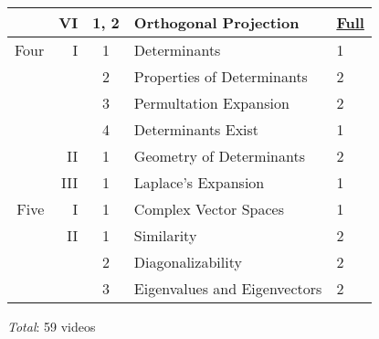 \documentclass{article}
\begin{document}
\begin{center}
\begin{tabular}{|rrc|ll|}
      \cline{4-5}
      &VI  &1, 2 &Orthogonal Projection  &\href{https://youtu.be/AAjZJjByU3U}{Full}   \\
  \hline
 Four &I   &1 &Determinants                       &1   \\
      &    &2 &Properties of Determinants         &2   \\
      &    &3 &Permultation Expansion             &2   \\
      &    &4 &Determinants Exist                 &1   \\
      \cline{4-5}
      &II  &1 &Geometry of Determinants           &2   \\
      \cline{4-5}
      &III &1 &Laplace's Expansion                &1   \\
 \hline
 Five &I   &1 &Complex Vector Spaces              &1   \\
      \cline{4-5}
      &II  &1 &Similarity                         &2   \\
      &    &2 &Diagonalizability                  &2   \\
      &    &3 &Eigenvalues and Eigenvectors       &2   \\
 \hline
\end{tabular}
\end{center}
\vspace{1ex}
\textit{Total}: 59 videos
\end{document}
